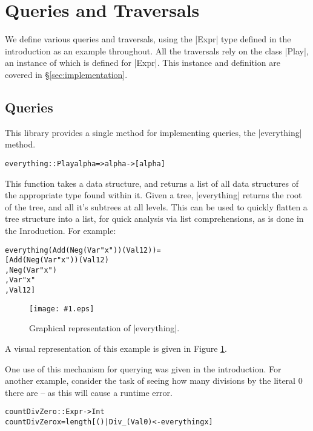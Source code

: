 \documentclass[preprint]{sigplanconf}
\newcommand{\pic}[1]{\texttt{[image: \#1.eps]}}
\newenvironment{code}{\begin{alltt}\small}{\end{alltt}}
\begin{document}
\section{Queries and Traversals}

We define various queries and traversals, using the |Expr| type defined in the introduction as an example throughout. All the traversals rely on the class |Play|, an instance of which is defined for |Expr|. This instance and definition are covered in \S\ref{sec:implementation}.

\subsection{Queries}

This library provides a single method for implementing queries, the |everything| method.

\begin{code}
everything :: Play alpha => alpha -> [alpha]
\end{code}

This function takes a data structure, and returns a list of all data structures of the appropriate type found within it. Given a tree, |everything| returns the root of the tree, and all it's subtrees at all levels. This can be used to quickly flatten a tree structure into a list, for quick analysis via list comprehensions, as is done in the Inroduction. For example:

\begin{code}
everything (Add (Neg (Var "x")) (Val 12)) =
    [Add (Neg (Var "x")) (Val 12)
    ,Neg (Var "x")
    ,Var "x"
    ,Val 12]
\end{code}

\begin{figure}
\pic{everything2}
\caption{Graphical representation of |everything|.}
\label{fig:everything}
\end{figure}

A visual representation of this example is given in Figure \ref{fig:everything}.

One use of this mechanism for querying was given in the introduction. For another example, consider the task of seeing how many divisions by the literal 0 there are -- as this will cause a runtime error.

\begin{code}
countDivZero :: Expr -> Int
countDivZero x = length [() | Div _ (Val 0) <- everything x]
\end{code}
\end{document}
